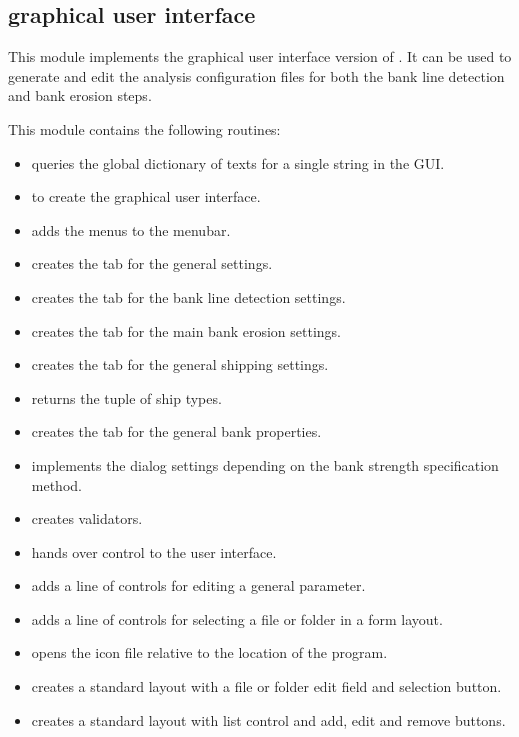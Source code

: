 \subsection{graphical user interface }

This module implements the graphical user interface version of \dfastbe.
It can be used to generate and edit the analysis configuration files for both the bank line detection and bank erosion steps.

This module contains the following routines:

\begin{itemize}
\item {} queries the global dictionary of texts for a single string in the GUI.
\item {} to create the graphical user interface.
\item {} adds the menus to the menubar.
\item {} creates the tab for the general settings.
\item {} creates the tab for the bank line detection settings.
\item {} creates the tab for the main bank erosion settings.
\item {} creates the tab for the general shipping settings.
\item {} returns the tuple of ship types.
\item {} creates the tab for the general bank properties.
\item {} implements the dialog settings depending on the bank strength specification method.
\item {} creates validators.
\item {} hands over control to the user interface.
\item {} adds a line of controls for editing a general parameter.
\item {} adds a line of controls for selecting a file or folder in a form layout.
\item {} opens the icon file relative to the location of the program.
\item {} creates a standard layout with a file or folder edit field and selection button.
\item {} creates a standard layout with list control and add, edit and remove buttons.

\end{itemize}
